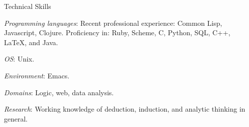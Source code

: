 \begin{rubric}{Technical Skills}{


  \entry* \emph{Programming languages}: Recent professional
  experience:  Common Lisp, Javascript, Clojure. Proficiency in:
  Ruby, Scheme, C, Python, SQL, C++, \LaTeX{}, and Java.

  \entry* \emph{OS}: Unix.

  \entry* \emph{Environment}: Emacs.

  \entry* \emph{Domains}: Logic, web, data analysis.

  \entry* \emph{Research}: Working knowledge of deduction, induction,
  and analytic thinking in general.

}\end{rubric}
